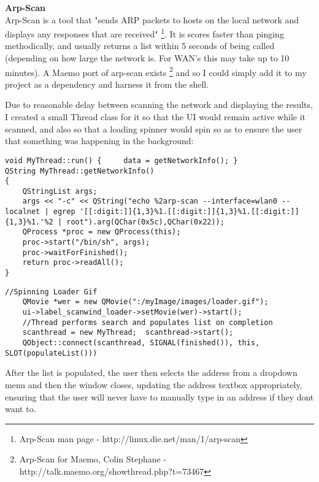 {\bf Arp-Scan}\\
Arp-Scan is a tool that "sends ARP packets to hosts on the local network and displays any responses that are received" \footnote{Arp-Scan man page - http://linux.die.net/man/1/arp-scan}. It is scores faster than pinging methodically, and usually returns a list within 5 seconds of being called (depending on how large the network is. For WAN's this may take up to 10 minutes).
A Maemo port of arp-scan exists \footnote{Arp-Scan for Maemo, Colin Stephane - http://talk.maemo.org/showthread.php?t=73467} and so I could simply add it to my project as a dependency and harness it from the shell.

Due to reasonable delay between scanning the network and displaying the results, I created a small Thread class for it so that the UI would remain active while it scanned, and also so that a loading spinner would spin so as to ensure the user that something was happening in the background:
\vspace{-15pt}
\begin{lstlisting}[title=\bf Snippet from MyThread.cpp for Scanning network and Retrieving data]
void MyThread::run() {     data = getNetworkInfo(); }
QString MyThread::getNetworkInfo()
{
    QStringList args;
    args << "-c" << QString("echo %2arp-scan --interface=wlan0 --localnet | egrep '[[:digit:]]{1,3}%1.[[:digit:]]{1,3}%1.[[:digit:]]{1,3}%1.'%2 | root").arg(QChar(0x5c),QChar(0x22));
    QProcess *proc = new QProcess(this);
    proc->start("/bin/sh", args);
    proc->waitForFinished();
    return proc->readAll();
}
\end{lstlisting}
\vspace{-20pt}
\begin{lstlisting}[title=\bf Snippet from ScanWind.cpp which calls MyThread]
    //Spinning Loader Gif
    QMovie *wer = new QMovie(":/myImage/images/loader.gif");
    ui->label_scanwind_loader->setMovie(wer)->start();
    //Thread performs search and populates list on completion
    scanthread = new MyThread;  scanthread->start();
    QObject::connect(scanthread, SIGNAL(finished()), this, SLOT(populateList()))
\end{lstlisting}

After the list is populated, the user then selects the address from a dropdown menu and then the window closes, updating the address textbox appropriately, ensuring that the user will never have to manually type in an address if they dont want to.


